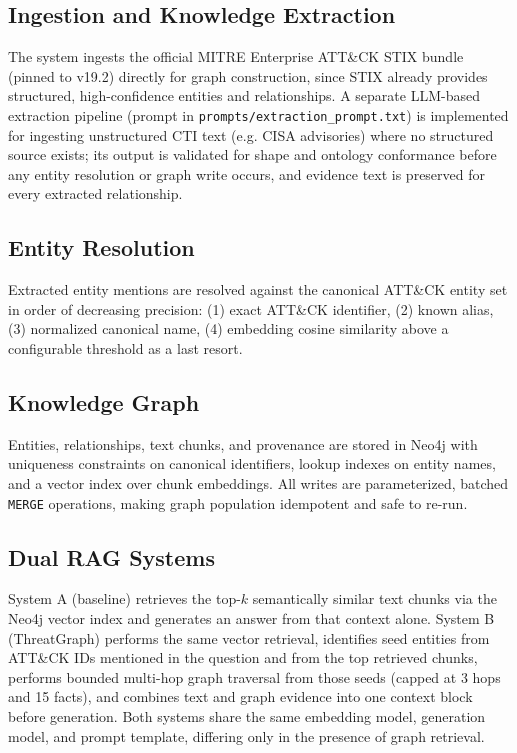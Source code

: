 \documentclass[conference]{IEEEtran}
\begin{document}
\subsection{Ingestion and Knowledge Extraction}
The system ingests the official MITRE Enterprise ATT\&CK STIX bundle
(pinned to v19.2) directly for graph construction, since STIX already
provides structured, high-confidence entities and relationships. A separate
LLM-based extraction pipeline (prompt in
\texttt{prompts/extraction\_prompt.txt}) is implemented for ingesting
unstructured CTI text (e.g. CISA advisories) where no structured source
exists; its output is validated for shape and ontology conformance before
any entity resolution or graph write occurs, and evidence text is preserved
for every extracted relationship.

\subsection{Entity Resolution}
Extracted entity mentions are resolved against the canonical ATT\&CK entity
set in order of decreasing precision: (1) exact ATT\&CK identifier, (2)
known alias, (3) normalized canonical name, (4) embedding cosine similarity
above a configurable threshold as a last resort.

\subsection{Knowledge Graph}
Entities, relationships, text chunks, and provenance are stored in Neo4j
with uniqueness constraints on canonical identifiers, lookup indexes on
entity names, and a vector index over chunk embeddings. All writes are
parameterized, batched \texttt{MERGE} operations, making graph population
idempotent and safe to re-run.

\subsection{Dual RAG Systems}
System A (baseline) retrieves the top-$k$ semantically similar text chunks
via the Neo4j vector index and generates an answer from that context alone.
System B (ThreatGraph) performs the same vector retrieval, identifies seed
entities from ATT\&CK IDs mentioned in the question and from the top
retrieved chunks, performs bounded multi-hop graph traversal from those
seeds (capped at 3 hops and 15 facts), and combines text and
graph evidence into one context block before generation. Both systems share
the same embedding model, generation model, and prompt template, differing
only in the presence of graph retrieval.
\end{document}
